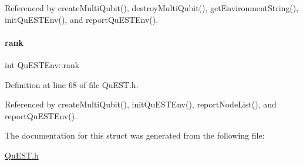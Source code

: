 Referenced by create\+Multi\+Qubit(), destroy\+Multi\+Qubit(), get\+Environment\+String(), init\+Qu\+E\+S\+T\+Env(), and report\+Qu\+E\+S\+T\+Env().

\mbox{\label{structQuESTEnv_aa648bb336cf8598467cb62db00b9cee8}} 
\paragraph{\texorpdfstring{rank}{rank}}
{\footnotesize\ttfamily int Qu\+E\+S\+T\+Env\+::rank}



Definition at line 68 of file Qu\+E\+S\+T.\+h.



Referenced by create\+Multi\+Qubit(), init\+Qu\+E\+S\+T\+Env(), report\+Node\+List(), and report\+Qu\+E\+S\+T\+Env().



The documentation for this struct was generated from the following file\+:\begin{DoxyCompactItemize}
\item 
\mbox{\hyperlink{QuEST_8h}{Qu\+E\+S\+T.\+h}}\end{DoxyCompactItemize}
